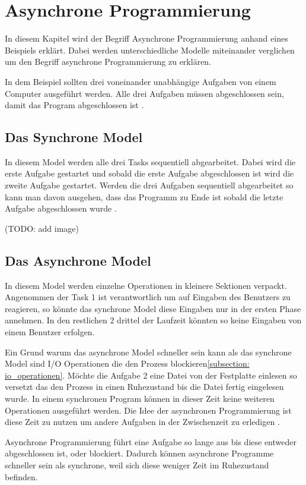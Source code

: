 \section{Asynchrone Programmierung}

In diesem Kapitel wird der Begriff Asynchrone Programmierung anhand eines Beispiels erklärt. Dabei werden unterschiedliche Modelle miteinander verglichen um den Begriff asynchrone Programmierung zu erklären.

In dem Beispiel sollten drei voneinander unabhängige Aufgaben von einem Computer ausgeführt werden. Alle drei Aufgaben müssen abgeschlossen sein, damit das Program abgeschlossen ist \cite[]{Pet2015}. 

\subsection{Das Synchrone Model}

In diesem Model werden alle drei Tasks sequentiell abgearbeitet. Dabei wird die erste Aufgabe gestartet und sobald die erste Aufgabe abgeschlossen ist wird die zweite Aufgabe gestartet. Werden die drei Aufgaben sequentiell abgearbeitet so kann man davon ausgehen, dass das Programm zu Ende ist sobald die letzte Aufgabe abgeschlossen wurde \cite[]{Pet2015}.

(TODO: add image)

\subsection{Das Asynchrone Model}

In diesem Model werden einzelne Operationen in kleinere Sektionen verpackt. Angenommen der Task 1 ist verantwortlich um auf Eingaben des Benutzers zu reagieren, so könnte das synchrone Model diese Eingaben nur in der ersten Phase annehmen. In den restlichen 2 drittel der Laufzeit könnten so keine Eingaben von einem Benutzer erfolgen.

Ein Grund warum das asynchrone Model schneller sein kann als das synchrone Model sind I/O Operationen die den Prozess blockieren\ref{subsection: io_operationen}. Möchte die Aufgabe 2 eine Datei von der Festplatte einlesen so versetzt das den Prozess in einen Ruhezustand bis die Datei fertig eingelesen wurde. In einem synchronen Program können in dieser Zeit keine weiteren Operationen ausgeführt werden. Die Idee der asynchronen Programmierung ist diese Zeit zu nutzen um andere Aufgaben in der Zwischenzeit zu erledigen \cite[]{Pet2015}. 

Asynchrone Programmierung führt eine Aufgabe so lange aus bis diese entweder abgeschlossen ist, oder blockiert. Dadurch können asynchrone Programme schneller sein als synchrone, weil sich diese weniger Zeit im Ruhezustand befinden.  

